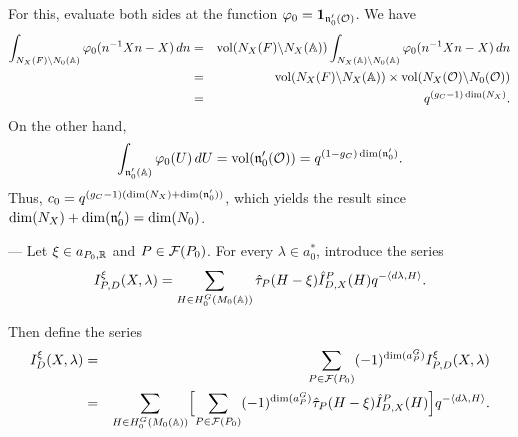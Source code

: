 \begin{paragr}
\begin{preuve}
For this, evaluate both sides at the function $\varphi_0=\mathbf{1}_{\mathfrak{n}_0'(\mathcal{O})}$. We have 
\begin{eqnarray*}
 \int_{N_X(F)\backslash N_0(\mathbb{A})} \varphi_0(n^{-1}Xn-X)\, dn&= &\operatorname{vol}(N_X(F)\backslash N_X(\mathbb{A}))\int_{N_X(\mathbb{A})\backslash N_0(\mathbb{A})} \varphi_0(n^{-1}Xn-X)\, dn \\
&=& \operatorname{vol}(N_X(F)\backslash N_X(\mathbb{A})) \times \operatorname{vol}(N_X(\mathcal{O})\backslash N_0(\mathcal{O}))\\
&=& q^{(g_C-1)\dim(N_X)}.
\end{eqnarray*}
On the other hand,
$$\int_{\mathfrak{n}_0'(\mathbb{A})}\varphi_0(U)\,dU=\operatorname{vol}(\mathfrak{n}_0'(\mathcal{O}))=q^{(1-g_C)\dim(\mathfrak{n}_0') }.$$
Thus, $c_0=q^{ (g_C-1)(\dim(N_X)+\dim(\mathfrak{n}_0'))}$, which yields the result since $\dim(N_X)+\dim(\mathfrak{n}_0')=\dim(N_0)$.
\end{preuve}
\end{paragr}

\begin{paragr} ---\label{S:calculI}
Let $\xi\in a_{P_0,\mathbb{R}}$ and $P\in \mathcal{F}(P_0)$. For every $\lambda\in a_{0}^*$, introduce the series
\begin{equation}
    \label{eq:laserieIxiPD}
    I^{\xi}_{P,D}(X,\lambda)= \sum_{H\in H_{0}^G(M_0(\mathbb{A}))} \hat{\tau}_P(H-\xi) \hat{I}^P_{D,X}(H)   q^{-\langle d\lambda, H\rangle}.
\end{equation}
  
Then define the series
\begin{eqnarray} \label{eq:laserieIxiD}
  I^{\xi}_D(X,\lambda)&=& \sum_{P\in \mathcal{F}(P_0) } (-1)^{\dim(a_P^G)} I^{\xi}_{P,D}(X,\lambda)\\
  &=&\nonumber  \sum_{H\in H_{0}^G(M_0(\mathbb{A}))} \Bigl[\sum_{P\in \mathcal{F}(P_0) } (-1)^{\dim(a_P^G)}\hat{\tau}_P(H-\xi) \hat{I}^P_{D,X}(H) \Bigr]   q^{-\langle d\lambda, H\rangle}.
\end{eqnarray}
\end{paragr}

